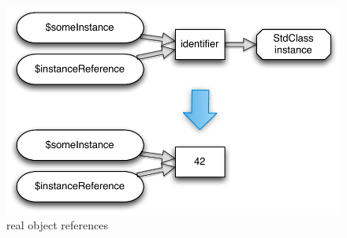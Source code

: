 \begin{figure}[!h]
  \begin{center}
    \includegraphics[scale=0.8]{images/someInstance_instanceReference}
    \caption{real object references}
    \label{fig:real-object-references}
  \end{center}
\end{figure}
